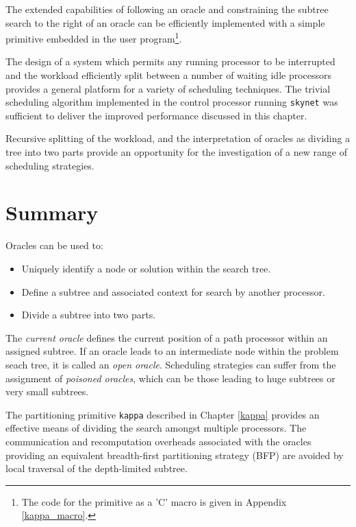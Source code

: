 The extended capabilities of following an oracle and constraining the subtree
search to the right of an oracle can be efficiently implemented with a simple
primitive embedded in the user program\footnote{The code for the primitive as
a 'C' macro is given in Appendix \ref{kappa_macro}.}.

The design of a system which permits any running processor to be interrupted and
the workload efficiently split between a number of waiting idle processors provides
a general platform for a variety of scheduling techniques.
The trivial scheduling algorithm implemented in the control processor running
\texttt{skynet} was sufficient to deliver the improved performance discussed
in this chapter.

Recursive splitting of the workload, and the interpretation of oracles
as dividing a tree into two parts provide an opportunity for the
investigation of a new range of scheduling strategies.

\section{Summary} %

Oracles can be used to:
\begin{itemize}
\item{Uniquely identify a node or solution within the search tree.}
\item{Define a subtree and associated context for search by another processor.}
\item{Divide a subtree into two parts.}
\end{itemize}

The \textit{current oracle} defines the current position of a path processor
within an assigned subtree.  If an oracle leads to an intermediate node within
the problem seach tree, it is called an \textit{open oracle}.
Scheduling strategies can suffer from the
assignment of \textit{poisoned oracles}, which can be those leading to huge
subtrees or very small subtrees.

The partitioning primitive \texttt{kappa} described in Chapter \ref{kappa}
provides an effective means of dividing the search amongst multiple
processors.  The communication
and recomputation overheads associated with the oracles providing an
equivalent breadth-first partitioning strategy (BFP) are avoided by
local traversal of the depth-limited subtree.

